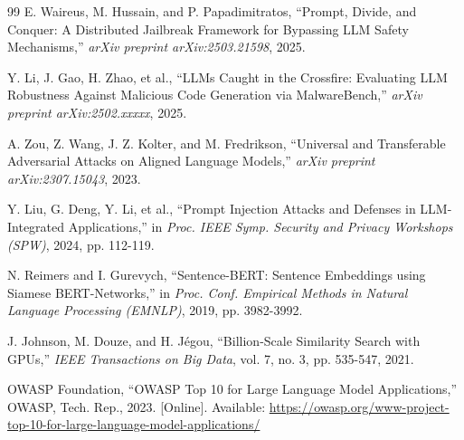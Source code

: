 \documentclass[conference]{IEEEtran}
\begin{document}
\begin{thebibliography}{99}
 E. Waireus, M. Hussain, and P. Papadimitratos, ``Prompt, Divide, and Conquer: A Distributed Jailbreak Framework for Bypassing LLM Safety Mechanisms,'' \textit{arXiv preprint arXiv:2503.21598}, 2025.

 Y. Li, J. Gao, H. Zhao, et al., ``LLMs Caught in the Crossfire: Evaluating LLM Robustness Against Malicious Code Generation via MalwareBench,'' \textit{arXiv preprint arXiv:2502.xxxxx}, 2025.

 A. Zou, Z. Wang, J. Z. Kolter, and M. Fredrikson, ``Universal and Transferable Adversarial Attacks on Aligned Language Models,'' \textit{arXiv preprint arXiv:2307.15043}, 2023.

 Y. Liu, G. Deng, Y. Li, et al., ``Prompt Injection Attacks and Defenses in LLM-Integrated Applications,'' in \textit{Proc. IEEE Symp. Security and Privacy Workshops (SPW)}, 2024, pp. 112-119.

 N. Reimers and I. Gurevych, ``Sentence-BERT: Sentence Embeddings using Siamese BERT-Networks,'' in \textit{Proc. Conf. Empirical Methods in Natural Language Processing (EMNLP)}, 2019, pp. 3982-3992.

 J. Johnson, M. Douze, and H. Jégou, ``Billion-Scale Similarity Search with GPUs,'' \textit{IEEE Transactions on Big Data}, vol. 7, no. 3, pp. 535-547, 2021.

 OWASP Foundation, ``OWASP Top 10 for Large Language Model Applications,'' OWASP, Tech. Rep., 2023. [Online]. Available: \url{https://owasp.org/www-project-top-10-for-large-language-model-applications/}
\end{thebibliography}
\end{document}
